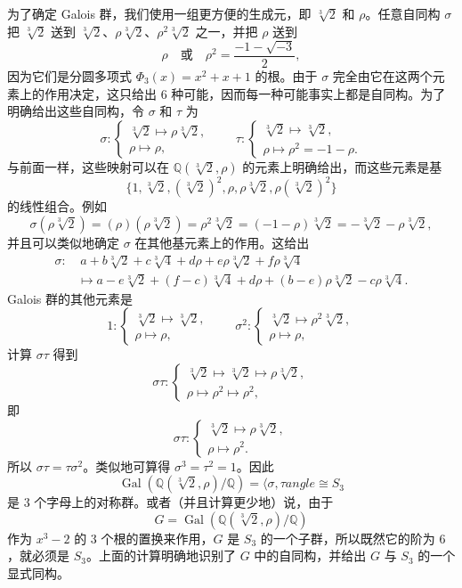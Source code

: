 \begin{enumerate}[label=(\arabic*)]
为了确定 Galois 群，我们使用一组更方便的生成元，即 $\sqrt[3]{2}$ 和 $\rho$。任意自同构 $\sigma$ 把 $\sqrt[3]{2}$ 送到 $\sqrt[3]{2}$、$\rho\sqrt[3]{2}$、$\rho^2\sqrt[3]{2}$ 之一，并把 $\rho$ 送到
\[
\rho\quad\text{或}\quad \rho^2=\frac{-1-\sqrt{-3}}{2},
\]
因为它们是分圆多项式 $\Phi_3(x)=x^2+x+1$ 的根。由于 $\sigma$ 完全由它在这两个元素上的作用决定，这只给出 $6$ 种可能，因而每一种可能事实上都是自同构。为了明确给出这些自同构，令 $\sigma$ 和 $\tau$ 为
\[
\sigma:\left\{
\begin{array}{l}
\sqrt[3]{2}\mapsto \rho\sqrt[3]{2},\\
\rho\mapsto \rho,
\end{array}\right.
\qquad
\tau:\left\{
\begin{array}{l}
\sqrt[3]{2}\mapsto \sqrt[3]{2},\\
\rho\mapsto \rho^2=-1-\rho.
\end{array}\right.
\]
与前面一样，这些映射可以在 $\mathbb Q(\sqrt[3]{2},\rho)$ 的元素上明确给出，而这些元素是基
\[
\{1,\sqrt[3]{2},(\sqrt[3]{2})^2,\rho,\rho\sqrt[3]{2},\rho(\sqrt[3]{2})^2\}
\]
的线性组合。例如
\[
\sigma(\rho\sqrt[3]{2})=(\rho)(\rho\sqrt[3]{2})=\rho^2\sqrt[3]{2}=(-1-\rho)\sqrt[3]{2}
=-\sqrt[3]{2}-\rho\sqrt[3]{2},
\]
并且可以类似地确定 $\sigma$ 在其他基元素上的作用。这给出
\[
\begin{aligned}
\sigma:&\ a+b\sqrt[3]{2}+c\sqrt[3]{4}+d\rho+e\rho\sqrt[3]{2}+f\rho\sqrt[3]{4} \\
&\longmapsto
 a-e\sqrt[3]{2}+(f-c)\sqrt[3]{4}+d\rho+(b-e)\rho\sqrt[3]{2}-c\rho\sqrt[3]{4}.
\end{aligned}
\tag{14.1}
\]
Galois 群的其他元素是
\[
1:\left\{
\begin{array}{l}
\sqrt[3]{2}\mapsto\sqrt[3]{2},\\
\rho\mapsto\rho,
\end{array}\right.
\qquad
\sigma^2:\left\{
\begin{array}{l}
\sqrt[3]{2}\mapsto\rho^2\sqrt[3]{2},\\
\rho\mapsto\rho,
\end{array}\right.
\]
计算 $\sigma\tau$ 得到
\[
\sigma\tau:\left\{
\begin{array}{l}
\sqrt[3]{2}\mapsto \sqrt[3]{2}\mapsto \rho\sqrt[3]{2},\\
\rho\mapsto \rho^2\mapsto \rho^2,
\end{array}\right.
\]
即
\[
\sigma\tau:\left\{
\begin{array}{l}
\sqrt[3]{2}\mapsto \rho\sqrt[3]{2},\\
\rho\mapsto \rho^2.
\end{array}\right.
\]
所以 $\sigma\tau=\tau\sigma^2$。类似地可算得 $\sigma^3=\tau^2=1$。因此
\[
\operatorname{Gal}(\mathbb Q(\sqrt[3]{2},\rho)/\mathbb Q)=\langle \sigma,\tau
angle\cong S_3
\]
是 $3$ 个字母上的对称群。或者（并且计算更少地）说，由于
\[
G=\operatorname{Gal}(\mathbb Q(\sqrt[3]{2},\rho)/\mathbb Q)
\]
作为 $x^3-2$ 的 $3$ 个根的置换来作用，$G$ 是 $S_3$ 的一个子群，所以既然它的阶为 $6$，就必须是 $S_3$。上面的计算明确地识别了 $G$ 中的自同构，并给出 $G$ 与 $S_3$ 的一个显式同构。


\end{enumerate}
